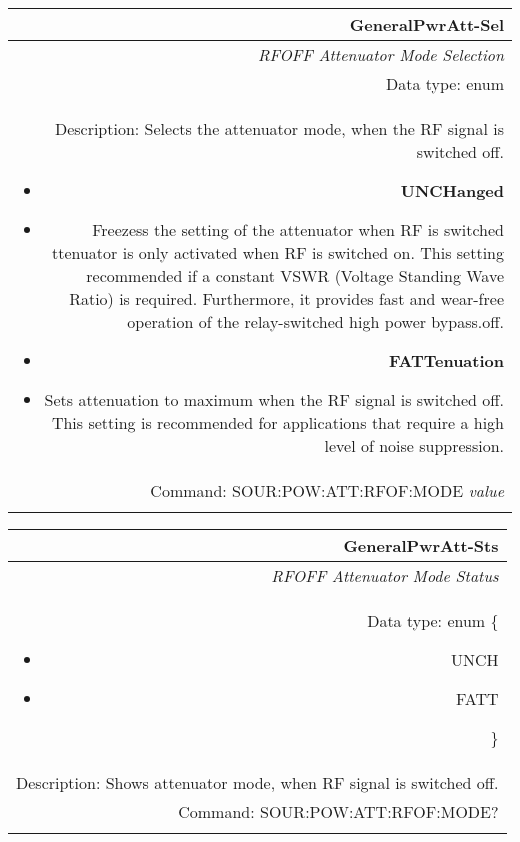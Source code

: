 \documentclass[openany]{article}
\begin{document}
		\begin{tabular}{N}
			\hline
			\bfseries GeneralPwrAtt-Sel  \\ \hline
			\emph{RFOFF Attenuator Mode Selection} \\
			Data type: enum \\
			Description: Selects the attenuator mode, when the RF signal is switched off. \begin{itemize}[noitemsep]
				\small
				\item[] \textbf{UNCHanged}
				\item[] Freezess the setting of the attenuator when RF is switched ttenuator is only activated when RF is switched on. This setting recommended if a constant VSWR (Voltage Standing Wave Ratio) is required. Furthermore, it provides fast and wear-free operation of the relay-switched high power bypass.off.
				\item[] \textbf{FATTenuation}
				\item[] Sets attenuation to maximum when the RF signal is switched off. This setting is recommended for applications that require a high level of noise suppression.
			\end{itemize} \\
			Command: SOUR:POW:ATT:RFOF:MODE \emph{value} \\
			\\ 

		\end{tabular}


		\begin{tabular}{N}
			\hline
			\bfseries GeneralPwrAtt-Sts \\ \hline
			\emph{RFOFF Attenuator Mode Status} \\
			Data type: enum \{\begin{itemize}[noitemsep]
				\small
				\item[] UNCH
				\item[] FATT
			\end{itemize}\} \\
			Description: Shows attenuator mode, when RF signal is switched off. \\
			Command: SOUR:POW:ATT:RFOF:MODE? \\
			\\

		\end{tabular}
\end{document}
